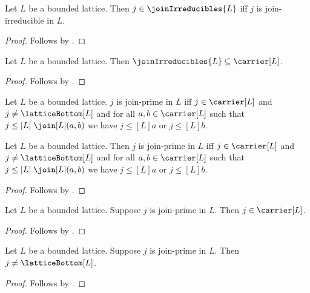 \begin{proposition}\label{join_irreducibles_iff}
    Let $L$ be a bounded lattice.
    Then $j\in\joinIrreducibles{L}$ iff
        $j$ is join-irreducible in $L$.
\end{proposition}
\begin{proof}
    Follows by
        .
\end{proof}

\begin{proposition}\label{join_irreducibles_subseteq_carrier}
    Let $L$ be a bounded lattice.
    Then $\joinIrreducibles{L}\subseteq\carrier[L]$.
\end{proposition}
\begin{proof}
    Follows by
        .
\end{proof}

\begin{definition}\label{join_prime}
    Let $L$ be a bounded lattice.
    $j$ is join-prime in $L$ iff
        $j\in\carrier[L]$ and
        $j\neq\latticeBottom[L]$ and
        for all $a,b\in\carrier[L]$ such that
            $j\mathrel{\leq[L]}\join[L](a,b)$ we have
            $j\mathrel{\leq[L]}a$ or $j\mathrel{\leq[L]}b$.
\end{definition}

\begin{proposition}\label{join_prime_iff}
    Let $L$ be a bounded lattice.
    Then $j$ is join-prime in $L$ iff
        $j\in\carrier[L]$ and
        $j\neq\latticeBottom[L]$ and
        for all $a,b\in\carrier[L]$ such that
            $j\mathrel{\leq[L]}\join[L](a,b)$ we have
            $j\mathrel{\leq[L]}a$ or $j\mathrel{\leq[L]}b$.
\end{proposition}
\begin{proof}
    Follows by .
\end{proof}

\begin{proposition}\label{join_prime_type}
    Let $L$ be a bounded lattice.
    Suppose $j$ is join-prime in $L$.
    Then $j\in\carrier[L]$.
\end{proposition}
\begin{proof}
    Follows by .
\end{proof}

\begin{proposition}\label{join_prime_nonbottom}
    Let $L$ be a bounded lattice.
    Suppose $j$ is join-prime in $L$.
    Then $j\neq\latticeBottom[L]$.
\end{proposition}
\begin{proof}
    Follows by .
\end{proof}

